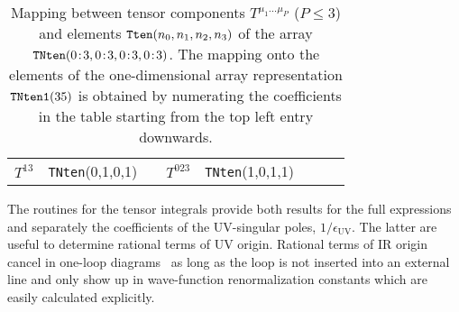 \documentclass[preprint,sort&compress,12pt]{elsarticle}
\def\eps{\epsilon}
\newcommand{\UV}{{\mathrm{UV}}}
\begin{document}
\begin{table}
\begin{center}
\begin{tabular}{l|lcl|lcl|l}
$T^{13}$  & {\tt TNten}(0,1,0,1)   &\phantom{spa}& $T^{023}$ & {\tt TNten}(1,0,1,1) &\phantom{spa}&  
                                   & \\  
   \end{tabular}
\end{center}
  \caption{Mapping between tensor components $T^{\mu_1\ldots \mu_P}$ ($P\le 3$) and elements 
${\tt Tten}(n_0,n_1,n_2,n_3)$ of the array ${\tt TNten}(0\!:\!3,0\!:\!3,0\!:\!3,0\!:\!3)$. The mapping onto 
the elements of the one-dimensional array representation ${\tt TNten1}(35)$ is obtained by 
numerating the coefficients in the table starting from the top left entry downwards.   
       }
  \label{tab:Telem}
\end{table}

The routines for the tensor integrals provide both results for the
full expressions and separately the coefficients of the UV-singular
poles, $1/\eps_\UV$. The latter are useful to determine rational
terms of UV origin. 
Rational terms of IR origin cancel in 
one-loop diagrams~\cite{Bredenstein:2008zb} 
as long as the loop is not inserted into an external line
and only show up in
wave-function renormalization constants which are easily calculated
explicitly.
\end{document}
